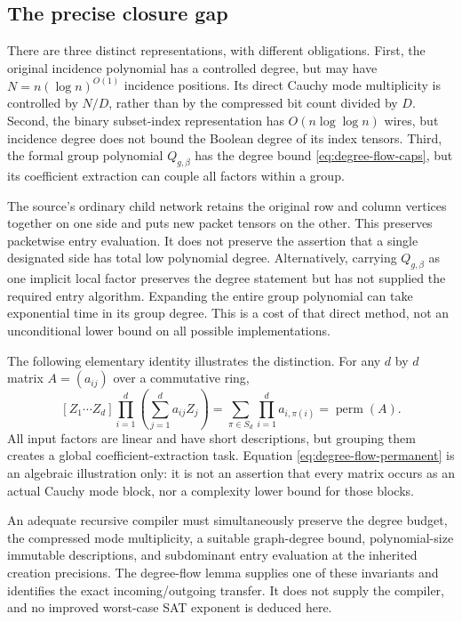 \subsection{The precise closure gap}
There are three distinct representations, with different obligations.
First, the original incidence polynomial has a controlled degree, but
may have $N=n(\log n)^{O(1)}$ incidence positions. Its direct Cauchy
mode multiplicity is controlled by $N/D$, rather than by the compressed
bit count divided by $D$. Second, the binary subset-index representation
has $O(n\log\log n)$ wires, but incidence degree does not bound the
Boolean degree of its index tensors. Third, the formal group polynomial
$Q_{g,\beta}$ has the degree bound \eqref{eq:degree-flow-caps}, but its
coefficient extraction can couple all factors within a group.

The source's ordinary child network retains the original row and column
vertices together on one side and puts new packet tensors on the other.
This preserves packetwise entry evaluation. It does not preserve the
assertion that a single designated side has total low polynomial degree.
Alternatively, carrying $Q_{g,\beta}$ as one implicit local factor
preserves the degree statement but has not supplied the required entry
algorithm. Expanding the entire group polynomial can take exponential
time in its group degree. This is a cost of that direct method, not an
unconditional lower bound on all possible implementations.

The following elementary identity illustrates the distinction. For any
$d$ by $d$ matrix $A=(a_{ij})$ over a commutative ring,
\begin{equation}\label{eq:degree-flow-permanent}
 [Z_1\cdots Z_d]\prod_{i=1}^d
       \left(\sum_{j=1}^d a_{ij}Z_j\right)
    =\sum_{\pi\in S_d}\prod_{i=1}^d a_{i,\pi(i)}
    =\operatorname{perm}(A).
\end{equation}
All input factors are linear and have short descriptions, but grouping
them creates a global coefficient-extraction task. Equation
\eqref{eq:degree-flow-permanent} is an algebraic illustration only: it
is not an assertion that every matrix occurs as an actual Cauchy mode
block, nor a complexity lower bound for those blocks.

An adequate recursive compiler must simultaneously preserve the degree
budget, the compressed mode multiplicity, a suitable graph-degree bound,
polynomial-size immutable descriptions, and subdominant entry evaluation
at the inherited creation precisions. The degree-flow lemma supplies
one of these invariants and identifies the exact incoming/outgoing
transfer. It does not supply the compiler, and no improved worst-case
SAT exponent is deduced here.

